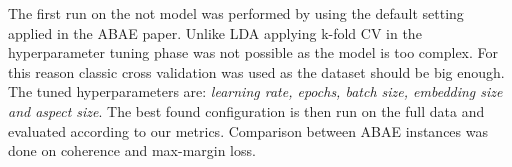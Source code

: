 The first run on the not model was performed by using the default setting applied in the ABAE paper.
Unlike LDA applying k-fold CV in the hyperparameter tuning phase was not possible as the model is too complex.
For this reason classic cross validation was used as the dataset should be big enough.
The tuned hyperparameters are: \textit{learning rate, epochs, batch size, embedding size and aspect size}.
The best found configuration is then run on the full data and evaluated according to our metrics.
Comparison between ABAE instances was done on coherence and max-margin loss.